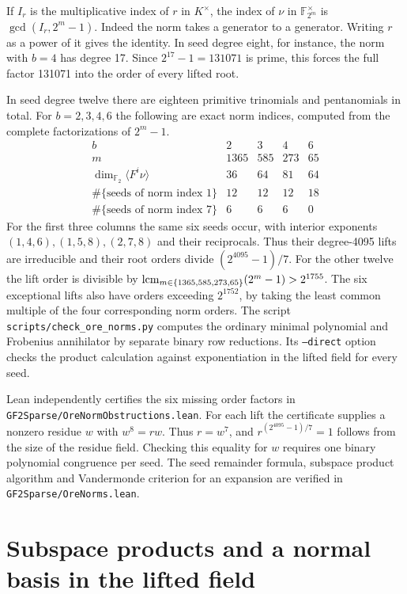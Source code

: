\documentclass[11pt]{article}
\newcommand{\F}{\mathbb F_2}
\begin{document}
If \(I_r\) is the multiplicative index of \(r\) in \(K^\times\), the
index of \(\nu\) in \(\mathbb F_{2^m}^\times\) is
\(\gcd(I_r,2^m-1)\). Indeed the norm takes a generator to a generator.
Writing \(r\) as a power of it gives the identity. In seed degree
eight, for instance, the norm with \(b=4\) has degree 17. Since
\(2^{17}-1=131071\) is prime, this forces the full factor 131071
into the order of every lifted root.

In seed degree twelve there are eighteen primitive trinomials and
pentanomials in total. For \(b=2,3,4,6\) the following are exact norm
indices, computed from the complete factorizations of \(2^m-1\).
\[
\begin{array}{c|rrrr}
 b&2&3&4&6\\ \hline
 m&1365&585&273&65\\
 \dim_{\F}\langle F^i\nu\rangle&36&64&81&64\\
 \#\{\text{seeds of norm index }1\}&12&12&12&18\\
 \#\{\text{seeds of norm index }7\}&6&6&6&0
\end{array}
\]
For the first three columns the same six seeds occur, with interior
exponents \((1,4,6),(1,5,8),(2,7,8)\) and their reciprocals. Thus
their degree-4095 lifts are irreducible and their root orders divide
\((2^{4095}-1)/7\). For the other twelve the lift order is divisible
by \(\mathop{\rm lcm}_{m\in\{1365,585,273,65\}}(2^m-1)>2^{1755}\).
The six exceptional lifts also have orders exceeding \(2^{1752}\), by
taking the least common multiple of the four corresponding norm orders.
The script \nolinkurl{scripts/check_ore_norms.py} computes the ordinary
minimal polynomial and Frobenius annihilator by separate binary row
reductions. Its \texttt{--direct} option checks the product calculation
against exponentiation in the lifted field for every seed.

Lean independently certifies the six missing order factors in
\nolinkurl{GF2Sparse/OreNormObstructions.lean}. For each lift the
certificate supplies a nonzero residue \(w\) with \(w^8=rw\).
Thus \(r=w^7\), and \(r^{(2^{4095}-1)/7}=1\) follows from the
size of the residue field. Checking this equality for \(w\) requires
one binary polynomial congruence per seed. The seed remainder formula,
subspace product algorithm and Vandermonde criterion for an expansion
are verified in \nolinkurl{GF2Sparse/OreNorms.lean}.


\section{Subspace products and a normal basis in the lifted field}\label{sec:ore-basis}
\end{document}
